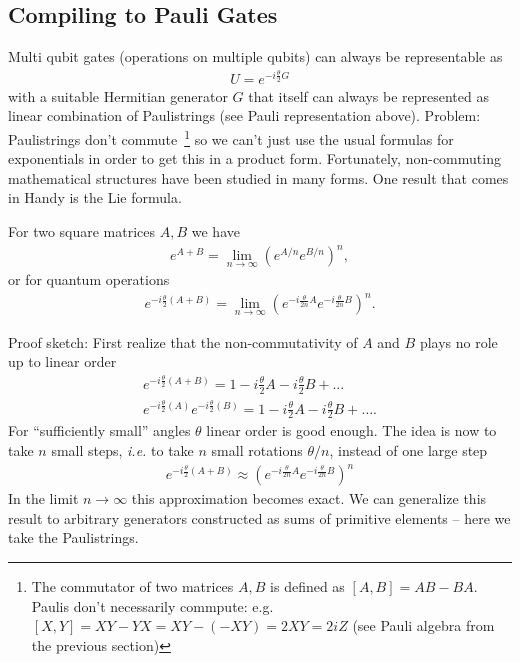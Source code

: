 \subsection{Compiling to Pauli Gates}
Multi qubit gates (operations on multiple qubits) can always be representable as
\begin{align}
    U = e^{-i\frac{\theta}{2} G}
\end{align}
with a suitable Hermitian generator $G$ that itself can always be represented as linear combination of Paulistrings (see Pauli representation above). Problem: Paulistrings don't commute~\footnote{The commutator of two matrices $A,B$ is defined as $[A,B]=AB-BA$. Paulis don't necessarily commpute: e.g. $[X,Y] = XY - YX = XY - (-XY) = 2XY = 2iZ$ (see Pauli algebra from the previous section)} so we can't just use the usual formulas for exponentials in order to get this in a product form. Fortunately, non-commuting mathematical structures have been studied in many forms. One result that comes in Handy is the Lie formula.
\begin{theorem*}
    For two square matrices $A,B$ we have
\begin{align}
    e^{A+B} = \lim_{n \rightarrow \infty } \left(e^{A/n}e^{B/n}\right)^n,
\end{align}
or for quantum operations 
\begin{align}
    e^{-i\frac{\theta}{2}\left(A+B\right)} = \lim_{n \rightarrow \infty } \left(e^{-i\frac{\theta}{2n}A}e^{-i\frac{\theta}{2n} B
    }\right)^n.
\end{align}
\end{theorem*}
Proof sketch: First realize that the non-commutativity of $A$ and $B$ plays no role up to linear order
\begin{align}
    e^{-i\frac{\theta}{2} \left(A + B\right)} = 1 - i\frac{\theta}{2} A - i\frac{\theta}{2} B + \dots \\
    e^{-i\frac{\theta}{2} \left(A\right)}e^{-i\frac{\theta}{2} \left(B\right)} = 1 - i\frac{\theta}{2} A - i\frac{\theta}{2} B + \dots. 
\end{align}
For ``sufficiently small'' angles $\theta$ linear order is good enough. The idea is now to take $n$ small steps, \textit{i.e.} to take $n$ small rotations $\theta/n$, instead of one large step
\begin{align}
    e^{-i\frac{\theta}{2}\left(A+B\right)} \approx \left(e^{-i\frac{\theta}{2n}A}e^{-i\frac{\theta}{2n} B
    }\right)^n
\end{align}
In the limit $n \rightarrow \infty$ this approximation becomes exact. We can generalize this result to arbitrary generators constructed as sums of primitive elements -- here we take the Paulistrings.
